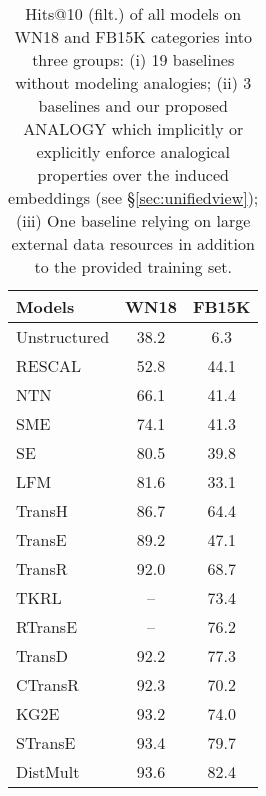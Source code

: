 \documentclass{article}
\begin{document}
\begin{table}[t]
    \centering
    \caption{Hits@10 (filt.) of all models on WN18 and FB15K categories into three groups: (i) 19 baselines without modeling analogies; (ii) 3 baselines and our proposed ANALOGY which implicitly or explicitly enforce analogical properties over the induced embeddings (see \S \ref{sec:unifiedview}); (iii) One baseline relying on large external data resources in addition to the provided training set.}
    \begin{tabular}{@{}l|cc@{}}
        \toprule
        Models                & WN18          & FB15K       \\ \midrule
        Unstructured \cite{bordes2013translating}     & 38.2          & 6.3         \\
        RESCAL \cite{nickel2011three}               & 52.8          & 44.1        \\
        NTN \cite{socher2013reasoning}              & 66.1          & 41.4        \\
        SME \cite{bordes2012joint}                  & 74.1          & 41.3        \\
        SE \cite{bordes2011learning}                    & 80.5          & 39.8        \\
        LFM \cite{jenatton2012latent}                  & 81.6          & 33.1        \\
        TransH \cite{wang2014knowledge}               & 86.7          & 64.4        \\
        TransE \cite{bordes2013translating}               & 89.2          & 47.1        \\
        TransR \cite{lin2015learning}               & 92.0            & 68.7        \\
        TKRL  \cite{xie2016representation} & -- & 73.4 \\
        RTransE \cite{garcia2015composing}              & --            & 76.2        \\
        TransD \cite{ji2015knowledge}               & 92.2          & 77.3        \\
        CTransR \cite{lin2015learning}              & 92.3          & 70.2        \\
        KG2E  \cite{he2015learning} & 93.2 & 74.0 \\
        STransE \cite{nguyen2016stranse}              & 93.4          & 79.7        \\
        DistMult \cite{DBLP:journals/corr/YangYHGD14a}    & 93.6          & 82.4        \\

\end{tabular}
\end{table}
\end{document}

